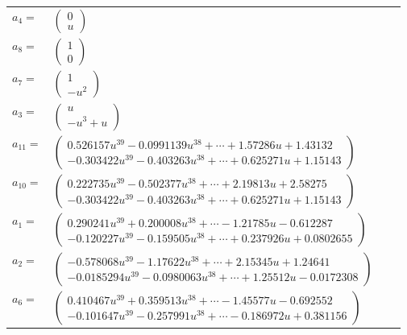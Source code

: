 \documentclass[1p]{elsarticle_modified}
\theoremstyle{definition}
\begin{document}
\begin{tabular}{m{7pt} m{180pt} m{7pt} m{180pt} }
\flushright $a_{4}=$&$\begin{pmatrix}0\\u\end{pmatrix}$ \\
\flushright $a_{8}=$&$\begin{pmatrix}1\\0\end{pmatrix}$ \\
\flushright $a_{7}=$&$\begin{pmatrix}1\\- u^2\end{pmatrix}$ \\
\flushright $a_{3}=$&$\begin{pmatrix}u\\- u^3+u\end{pmatrix}$ \\
\flushright $a_{11}=$&$\begin{pmatrix}0.526157 u^{39}-0.0991139 u^{38}+\cdots+1.57286 u+1.43132\\-0.303422 u^{39}-0.403263 u^{38}+\cdots+0.625271 u+1.15143\end{pmatrix}$ \\
\flushright $a_{10}=$&$\begin{pmatrix}0.222735 u^{39}-0.502377 u^{38}+\cdots+2.19813 u+2.58275\\-0.303422 u^{39}-0.403263 u^{38}+\cdots+0.625271 u+1.15143\end{pmatrix}$ \\
\flushright $a_{1}=$&$\begin{pmatrix}0.290241 u^{39}+0.200008 u^{38}+\cdots-1.21785 u-0.612287\\-0.120227 u^{39}-0.159505 u^{38}+\cdots+0.237926 u+0.0802655\end{pmatrix}$ \\
\flushright $a_{2}=$&$\begin{pmatrix}-0.578068 u^{39}-1.17622 u^{38}+\cdots+2.15345 u+1.24641\\-0.0185294 u^{39}-0.0980063 u^{38}+\cdots+1.25512 u-0.0172308\end{pmatrix}$ \\
\flushright $a_{6}=$&$\begin{pmatrix}0.410467 u^{39}+0.359513 u^{38}+\cdots-1.45577 u-0.692552\\-0.101647 u^{39}-0.257991 u^{38}+\cdots-0.186972 u+0.381156\end{pmatrix}$ \\

\end{tabular}
\end{document}
